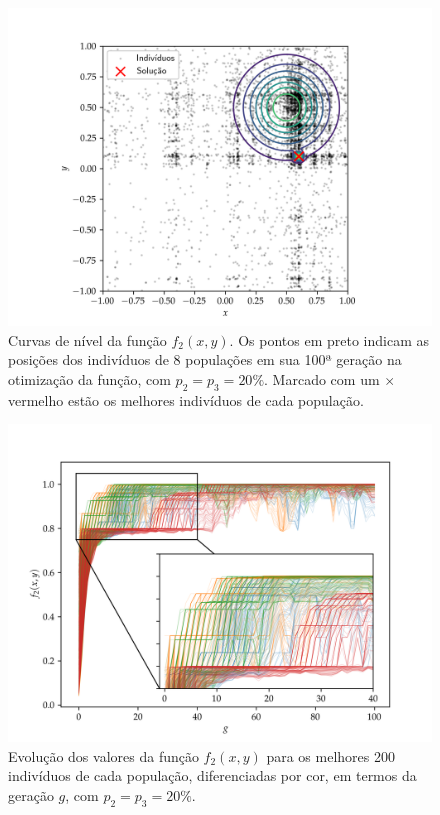 \begin{figure}[p]
  \centering
  \includegraphics[width=\textwidth]{imagens/high_prob/contour_near_gaussians.png}
  \caption{
    Curvas de nível da função $f_2(x,y)$. Os pontos em preto indicam as posições dos indivíduos
    de 8 populações em sua 100ª geração na otimização da função, com $ p_2 = p_3 = 20\% $. 
    Marcado com um $\times$ vermelho estão os melhores indivíduos de cada população.
  }
  \label{fig:contour_near_gaussians_mut_20}
\end{figure}

\begin{figure}[p]
  \centering
  \includegraphics[width=\textwidth]{imagens/high_prob/evolution_near_gaussians.png}
  \caption{
    Evolução dos valores da função $ f_2(x,y) $ para os
    melhores 200 indivíduos de cada população, diferenciadas por cor, em termos da geração $g$,
    com $ p_2 = p_3 = 20\% $.
  }
  \label{fig:evolution_near_gaussians_mut_20}
\end{figure}


